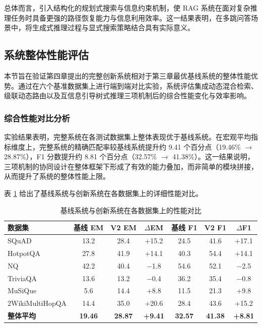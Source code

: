 总体而言，引入结构化的规划式搜索与信息约束机制，使 RAG 系统在面对复杂推理任务时具备更强的路径恢复能力与信息利用效率。这一结果表明，在多跳问答场景中，将生成式推理过程与显式搜索策略结合具有实际意义。

\subsection{系统整体性能评估}

本节旨在验证第四章提出的完整创新系统相对于第三章最优基线系统的整体性能优势。通过在六个基准数据集上进行端到端对比实验，系统评估集成动态混合检索、级联动态路由以及互信息引导树式推理三项机制后的综合性能变化与效率影响。

\subsubsection{综合性能对比分析}

实验结果表明，完整系统在各测试数据集上整体表现优于基线系统。在宏观平均指标维度上，完整系统的精确匹配率较基线系统提升约 9.41 个百分点（19.46\% $\rightarrow$ 28.87\%），F1 分数提升约 8.81 个百分点（32.57\% $\rightarrow$ 41.38\%）。这一结果说明，三项机制的协同设计在整体框架下形成了有效的能力叠加，而非简单的模块拼接，从而提升了系统的整体性能上限。


表 \ref{tab:chapter4_overall_results} 给出了基线系统与创新系统在各数据集上的详细性能对比。

\begin{table}[htbp]
    \centering
    \caption{基线系统与创新系统在各数据集上的性能对比}
    \label{tab:chapter4_overall_results}
    \renewcommand{\arraystretch}{1.3}
    \setlength{\tabcolsep}{4pt}
    \begin{tabular}{l c c c c c c}
        \toprule
        \textbf{数据集} & \textbf{基线 EM} & \textbf{V2 EM} & \textbf{$\Delta$EM} & \textbf{基线 F1} & \textbf{V2 F1} & \textbf{$\Delta$F1} \\
        \midrule
        SQuAD & 13.2 & 28.4 & +15.2 & 24.5 & 41.6 & +17.1 \\
        HotpotQA & 27.8 & 41.9 & +14.1 & 40.3 & 54.4 & +14.1 \\
        NQ & 42.2 & 40.4 & $-$1.8 & 54.6 & 52.1 & $-$2.5 \\
        TriviaQA & 13.6 & 13.2 & $-$0.4 & 36.2 & 35.4 & $-$0.8 \\
        MuSiQue & 5.6 & 14.4 & +8.8 & 11.5 & 21.3 & +9.8 \\
        2WikiMultiHopQA & 14.4 & 35.0 & +20.6 & 28.4 & 43.6 & +15.2 \\
        \midrule
        \textbf{整体平均} & \textbf{19.46} & \textbf{28.87} & \textbf{+9.41} & \textbf{32.57} & \textbf{41.38} & \textbf{+8.81} \\
        \bottomrule
    \end{tabular}
\end{table}

